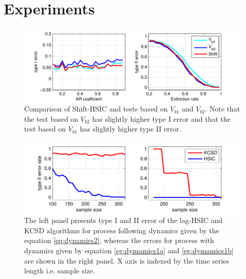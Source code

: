 \section{Experiments}
\label{sec:Experiments}




\begin{figure}
\centering  
\includegraphics[width=1\textwidth]{arExtinct.pdf}
\caption{Comparison of Shift-HSIC and tests based on $V_{b1}$ and $V_{b2}$. Note that the test based on $V_{b2}$ has slightly higher type I error and that the test based on $V_{b1}$ has slightly  higher type II error.}
\label{fig:arExtinct}
\end{figure}

\begin{figure}
\centering  
\includegraphics[width=1\textwidth]{varAndPhase.pdf}
\caption{The left panel presents type I and II error of the lag-HSIC and KCSD algorithms for process following dynamics given by the equation \eqref{eq:dynamics2}, whereas the errors for process with dynamics given by equation \eqref{eg:dymamics1a} and \eqref{eg:dymamics1b} are shown in the right panel. X axis is indexed by the time series length i.e. sample size.}
\label{fig:phaseAndVar}
\end{figure}

\vspace{-0.2cm}
